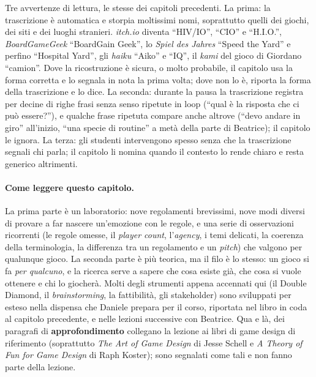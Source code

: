 Tre avvertenze di lettura, le stesse dei capitoli precedenti. La prima: la
trascrizione è automatica e storpia moltissimi nomi, soprattutto quelli dei
giochi, dei siti e dei luoghi stranieri. \emph{itch.io} diventa ``HIV/IO'', ``CIO'' e
``H.I.O.'', \emph{BoardGameGeek} ``BoardGain Geek'', lo \emph{Spiel des Jahres}
``Speed the Yard'' e perfino ``Hospital Yard'', gli \emph{haiku} ``Aiko'' e
``IQ'', il \emph{kami} del gioco di Giordano ``camion''. Dove la ricostruzione è
sicura, o molto probabile, il capitolo usa la forma corretta e lo segnala in nota la
prima volta; dove non lo è, riporta la forma della trascrizione e lo dice. La
seconda: durante la pausa la trascrizione registra per decine di righe frasi senza
senso ripetute in loop (``qual è la risposta che ci può essere?''), e qualche frase
ripetuta compare anche altrove (``devo andare in giro'' all'inizio, ``una specie di
routine'' a metà della parte di Beatrice); il capitolo le ignora. La terza: gli
studenti intervengono spesso senza che la trascrizione segnali chi parla; il
capitolo li nomina quando il contesto lo rende chiaro e resta generico altrimenti.

\paragraph{Come leggere questo capitolo.} La prima parte è un laboratorio: nove
regolamenti brevissimi, nove modi diversi di provare a far nascere un'emozione con
le regole, e una serie di osservazioni ricorrenti (le regole omesse, il
\emph{player count}, l'\emph{agency}, i temi delicati, la coerenza della
terminologia, la differenza tra un regolamento e un \emph{pitch}) che valgono per
qualunque gioco. La seconda parte è più teorica, ma il filo è lo stesso: un gioco si
fa \emph{per qualcuno}, e la ricerca serve a sapere che cosa esiste già, che cosa si
vuole ottenere e chi lo giocherà. Molti degli strumenti appena accennati qui (il
Double Diamond, il \emph{brainstorming}, la fattibilità, gli stakeholder) sono
sviluppati per esteso nella dispensa che Daniele prepara per il corso, riportata nel
libro in coda al capitolo precedente, e nelle lezioni successive con Beatrice. Qua e
là, dei paragrafi di \textbf{approfondimento} collegano la lezione ai libri di game
design di riferimento (soprattutto \emph{The Art of Game Design} di Jesse Schell e
\emph{A Theory of Fun for Game Design} di Raph Koster); sono segnalati come tali e
non fanno parte della lezione.

